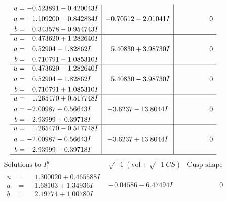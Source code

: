 \documentclass[1p]{elsarticle_modified}
\theoremstyle{definition}
\newcommand{\I}{\sqrt{-1}}
\begin{document}
$$\begin{array}{c|c|c}
\begin{aligned}
u &= -0.523891 - 0.420043 I \\
a &= -1.109200 - 0.842834 I \\
b &= \phantom{-}0.343578 - 0.954743 I\end{aligned}
 & -0.70512 - 2.01041 I & \phantom{-0.000000 } 0 \\ \hline\begin{aligned}
u &= \phantom{-}0.473620 + 1.282640 I \\
a &= \phantom{-}0.52904 - 1.82862 I \\
b &= \phantom{-}0.710791 - 1.085310 I\end{aligned}
 & \phantom{-}5.40830 + 3.98730 I & \phantom{-0.000000 } 0 \\ \hline\begin{aligned}
u &= \phantom{-}0.473620 - 1.282640 I \\
a &= \phantom{-}0.52904 + 1.82862 I \\
b &= \phantom{-}0.710791 + 1.085310 I\end{aligned}
 & \phantom{-}5.40830 - 3.98730 I & \phantom{-0.000000 } 0 \\ \hline\begin{aligned}
u &= \phantom{-}1.265470 + 0.517748 I \\
a &= -2.00987 + 0.56643 I \\
b &= -2.93999 + 0.39718 I\end{aligned}
 & -3.6237 - 13.8044 I & \phantom{-0.000000 } 0 \\ \hline\begin{aligned}
u &= \phantom{-}1.265470 - 0.517748 I \\
a &= -2.00987 - 0.56643 I \\
b &= -2.93999 - 0.39718 I\end{aligned}
 & -3.6237 + 13.8044 I & \phantom{-0.000000 } 0\\
 \hline 
 \end{array}$$\newpage$$\begin{array}{c|c|c}  
\text{Solutions to }I^u_{1}& \I (\text{vol} + \sqrt{-1}CS) & \text{Cusp shape}\\
 \hline 
\begin{aligned}
u &= \phantom{-}1.300020 + 0.465588 I \\
a &= \phantom{-}1.68103 + 1.34936 I \\
b &= \phantom{-}2.19774 + 1.00780 I\end{aligned}
 & -0.04586 - 6.47494 I & \phantom{-0.000000 } 0 \\ \hline\begin{aligned}

\end{aligned}
\end{array}$$
\end{document}
